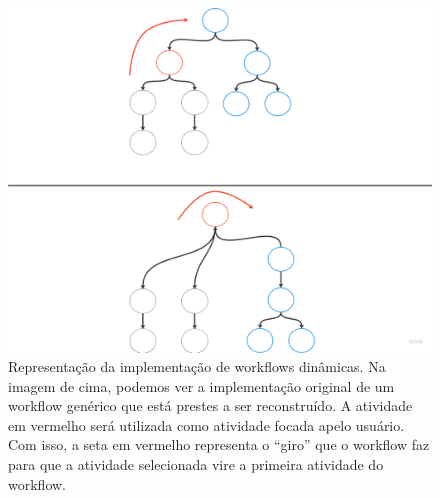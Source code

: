 \begin{figure}
    \centering
    \includegraphics[width=1\textwidth]{imgs/Implementacoes/primeiraImplementacao.png}
    \caption{Representação da implementação de workflows dinâmicas. Na imagem de cima, podemos ver a implementação original de um workflow genérico que está prestes a ser reconstruído. A atividade em vermelho será utilizada como atividade focada apelo usuário. Com isso, a seta em vermelho representa o ``giro'' que o workflow faz para que a atividade selecionada vire a primeira atividade do workflow.}
    \label{fig:primeira_implementacao}
\end{figure}

